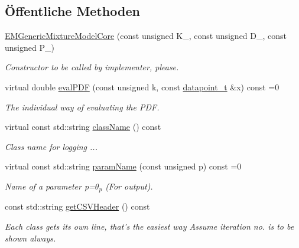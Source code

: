 \subsection*{Öffentliche Methoden}
\begin{DoxyCompactItemize}
\item 
\hyperlink{classCDA_1_1EMGenericMixtureModelCore_abbba5d71163475e49ac5334d32dce5ad}{EMGenericMixtureModelCore} (const unsigned K\_\-, const unsigned D\_\-, const unsigned P\_\-)
\begin{DoxyCompactList}\small\item\em Constructor to be called by implementer, please. \item\end{DoxyCompactList}\item 
virtual double \hyperlink{classCDA_1_1EMGenericMixtureModelCore_a3f291b20f5345b1e302bf46338d2f5f3}{evalPDF} (const unsigned k, const \hyperlink{classCDA_1_1EMGenericMixtureModelCore_a59c8aa9101530e99b1392d848fd50357}{datapoint\_\-t} \&x) const =0
\begin{DoxyCompactList}\small\item\em The individual way of evaluating the PDF. \item\end{DoxyCompactList}\item 
\hypertarget{classCDA_1_1EMGenericMixtureModelCore_a6e444765b04615888d41c4ab6c82ae61}{
virtual const std::string \hyperlink{classCDA_1_1EMGenericMixtureModelCore_a6e444765b04615888d41c4ab6c82ae61}{className} () const }
\label{classCDA_1_1EMGenericMixtureModelCore_a6e444765b04615888d41c4ab6c82ae61}

\begin{DoxyCompactList}\small\item\em Class name for logging ... \item\end{DoxyCompactList}\item 
virtual const std::string \hyperlink{classCDA_1_1EMGenericMixtureModelCore_a1200a3cfc4c19ddff0c6a7eb1f5d5b2f}{paramName} (const unsigned p) const =0
\begin{DoxyCompactList}\small\item\em Name of a parameter p=$\theta_p$ (For output). \item\end{DoxyCompactList}\item 
const std::string \hyperlink{classCDA_1_1EMGenericMixtureModelCore_a10bd69fd4b420a274aee5f10e09ed5fe}{getCSVHeader} () const 
\begin{DoxyCompactList}\small\item\em Each class gets its own line, that's the easiest way Assume iteration no. is to be shown always. \item\end{DoxyCompactList}\end{DoxyCompactItemize}
